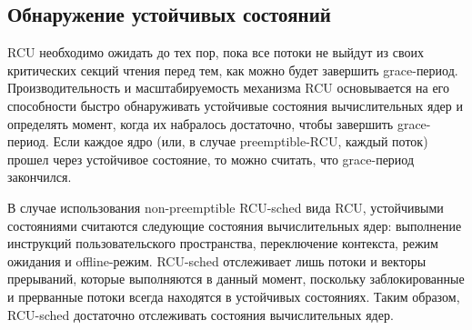 \subsection{Обнаружение устойчивых состояний} \label{sec:quiescent_state}
RCU необходимо ожидать до тех пор, пока все потоки не выйдут
из своих критических секций чтения перед тем, как можно будет
завершить grace-период.
Производительность и масштабируемость механизма RCU
основывается на его способности быстро обнаруживать
устойчивые состояния вычислительных ядер и определять
момент, когда их набралось достаточно, чтобы завершить
grace-период.
Если каждое ядро (или, в случае preemptible-RCU, каждый поток)
прошел через устойчивое состояние, то можно считать,
что grace-период закончился.

В случае использования non-preemptible RCU-sched вида RCU,
устойчивыми состояниями считаются следующие состояния вычислительных ядер:
выполнение инструкций пользовательского пространства,
переключение контекста, режим ожидания и offline-режим.
%
%
RCU-sched отслеживает лишь потоки и векторы прерываний,
которые выполняются в данный момент,
поскольку заблокированные и прерванные потоки всегда находятся в
устойчивых состояниях.
Таким образом, RCU-sched достаточно отслеживать состояния вычислительных ядер.

